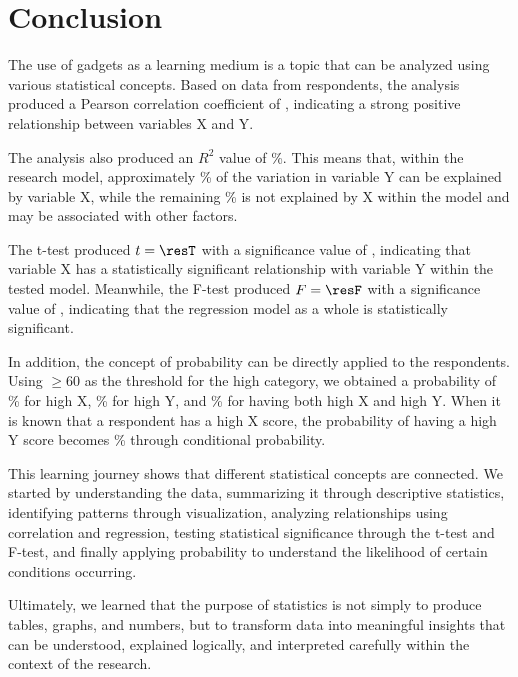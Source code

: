 \section{Conclusion}

The use of gadgets as a learning medium is a topic that can be analyzed
using various statistical concepts. Based on data from \resN{} respondents,
the analysis produced a Pearson correlation coefficient of \resR,
indicating a strong positive relationship between variables X and Y.

The analysis also produced an $R^2$ value of \resRSquaredPct\%. This means
that, within the research model, approximately \resRSquaredPct\% of the
variation in variable Y can be explained by variable X, while the
remaining \resUnexplainedPct\% is
not explained by X within the model and may be associated with other
factors.

The t-test produced $t = \resT$ with a significance value of \resSig,
indicating that variable X has a statistically significant relationship
with variable Y within the tested model. Meanwhile, the F-test
produced $F = \resF$ with a significance value of \resSig, indicating that
the regression model as a whole is statistically significant.

In addition, the concept of probability can be directly applied to the
\resN{} respondents. Using $\ge 60$ as the threshold for the high
category, we obtained a probability of \resPA\% for high X, \resPB\% for
high Y, and \resPAB\% for having both high X and high Y. When it is known
that a respondent has a high X score, the probability of having a high Y
score becomes \resPBGivenA\% through conditional probability.

This learning journey shows that different statistical concepts are
connected. We started by understanding the data, summarizing it through
descriptive statistics, identifying patterns through visualization,
analyzing relationships using correlation and regression, testing
statistical significance through the t-test and F-test, and finally
applying probability to understand the likelihood of certain conditions
occurring.

Ultimately, we learned that the purpose of statistics is not simply to
produce tables, graphs, and numbers, but to transform data into
meaningful insights that can be understood, explained logically, and
interpreted carefully within the context of the research.
